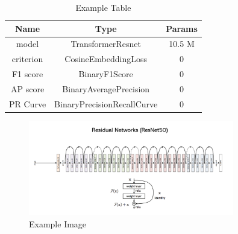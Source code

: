\documentclass{article}
\begin{document}
\begin{table}[h]
\centering
\begin{tabular}{| c | c | c |}\hline
Name & Type & Params \\ \hline
model & TransformerResnet & 10.5 M \\ \hline
criterion & CosineEmbeddingLoss & 0 \\ \hline
F1 score & BinaryF1Score & 0 \\ \hline
AP score & BinaryAveragePrecision & 0 \\ \hline
PR Curve & BinaryPrecisionRecallCurve & 0 \\ \hline
\end{tabular}
\caption{Example Table}
\label{tab:example}
\end{table}

    \begin{figure}[h]
        \centering
        \includegraphics[width=0.8\textwidth]{./hw2/artifacts/4451f11509ee37d5155e5d429a8e4a0a.png}
        \caption{Example Image}
        \label{fig:image}
    \end{figure}
    
\end{document}
